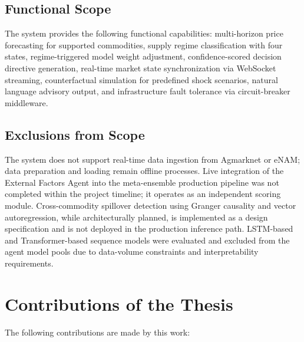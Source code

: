 \documentclass[12pt,a4paper]{report}
\begin{document}
\subsection{Functional Scope}

The system provides the following functional capabilities: multi-horizon price forecasting for supported commodities, supply regime classification with four states, regime-triggered model weight adjustment, confidence-scored decision directive generation, real-time market state synchronization via WebSocket streaming, counterfactual simulation for predefined shock scenarios, natural language advisory output, and infrastructure fault tolerance via circuit-breaker middleware.

\subsection{Exclusions from Scope}

The system does not support real-time data ingestion from Agmarknet or eNAM; data preparation and loading remain offline processes. Live integration of the External Factors Agent into the meta-ensemble production pipeline was not completed within the project timeline; it operates as an independent scoring module. Cross-commodity spillover detection using Granger causality and vector autoregression, while architecturally planned, is implemented as a design specification and is not deployed in the production inference path. LSTM-based and Transformer-based sequence models were evaluated and excluded from the agent model pools due to data-volume constraints and interpretability requirements.

\section{Contributions of the Thesis}

The following contributions are made by this work:
\end{document}
